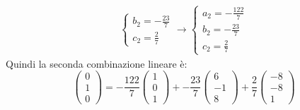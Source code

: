 \documentclass[a4paper]{article}
\begin{document}
\begin{itemize}
\begin{equation*}
\begin{array}{l}
\begin{cases}
					b_{2} = -\frac{23}{7} \\
					c_{2} = \frac{2}{7}
				\end{cases} \rightarrow
				\begin{cases}
					a_{2} = -\frac{122}{7} \\
					b_{2} = -\frac{23}{7} \\
					c_{2} = \frac{2}{7}
				\end{cases}
			\end{array}
		\end{equation*}
		Quindi la seconda combinazione lineare è:
		\begin{equation*}
			\begin{pmatrix}
				0 \\ 1 \\ 0
			\end{pmatrix} =
			-\dfrac{122}{7} \begin{pmatrix}
				1 \\ 0 \\ 1
			\end{pmatrix} +
			-\dfrac{23}{7} \begin{pmatrix}
				6 \\ -1 \\ 8
			\end{pmatrix} +
			\dfrac{2}{7} \begin{pmatrix}
				-8 \\ -8 \\ 1
			\end{pmatrix}
		\end{equation*}
		

\end{itemize}
\end{document}
